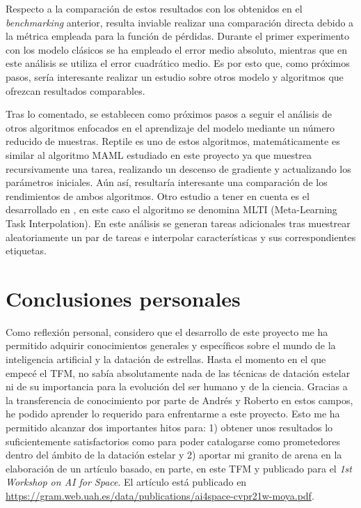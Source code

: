 Respecto a la comparación de estos resultados con los obtenidos en el \emph{benchmarking} anterior, resulta inviable realizar una comparación directa debido a la métrica empleada para la función de pérdidas. Durante el primer experimento con los modelo clásicos se ha empleado el error medio absoluto, mientras que en este análisis se utiliza el error cuadrático medio. Es por esto que, como próximos pasos, sería interesante realizar un estudio sobre otros modelo y algoritmos que ofrezcan resultados comparables.

Tras lo comentado, se establecen como próximos pasos a seguir el análisis de otros algoritmos enfocados en el aprendizaje del modelo mediante un número reducido de muestras. Reptile \cite{nichol2018firstorder} es uno de estos algoritmos, matemáticamente es similar al algoritmo MAML estudiado en este proyecto ya que muestrea recursivamente una tarea, realizando un descenso de gradiente y actualizando los parámetros iniciales. Aún así, resultaría interesante una comparación de los rendimientos de ambos algoritmos. Otro estudio a tener en cuenta es el desarrollado en \cite{yao2021metalearning}, en este caso el algoritmo se denomina MLTI (Meta-Learning Task Interpolation). En este análisis se generan tareas adicionales tras muestrear aleatoriamente un par de tareas e interpolar características y sus correspondientes etiquetas.
 

\section{Conclusiones personales}

Como reflexión personal, considero que el desarrollo de este proyecto me ha permitido adquirir conocimientos generales y específicos sobre el mundo de la inteligencia artificial y la datación de estrellas. Hasta el momento en el que empecé el TFM, no sabía absolutamente nada de las técnicas de datación estelar ni de su importancia para la evolución del ser humano y de la ciencia. Gracias a la transferencia de conocimiento por parte de Andrés y Roberto en estos campos, he podido aprender lo requerido para enfrentarme a este proyecto. Esto me ha permitido alcanzar dos importantes hitos para: 1) obtener unos resultados lo suficientemente satisfactorios como para poder catalogarse como prometedores dentro del ámbito de la datación estelar y 2) aportar mi granito de arena en la elaboración de un artículo basado, en parte, en este TFM y publicado para el \emph{1st Workshop on AI for Space}. El artículo está publicado en \url{https://gram.web.uah.es/data/publications/ai4space-cvpr21w-moya.pdf}.  %

